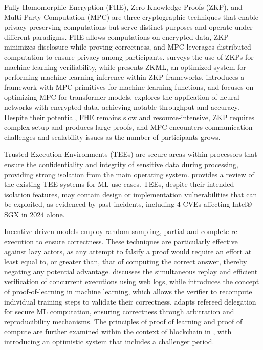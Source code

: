 \documentclass[sigconf, nonacm]{acmart}
\begin{document}
Fully Homomorphic Encryption (FHE), Zero-Knowledge Proofs (ZKP), and Multi-Party Computation (MPC) are three cryptographic techniques that enable privacy-preserving computations but serve distinct purposes and operate under different paradigms. FHE allows computations on encrypted data, ZKP minimizes disclosure while proving correctness, and MPC leverages distributed computation to ensure privacy among participants.
\cite{xing2023zero} surveys the use of ZKPs for machine learning verifiability, while \cite{chen2024zkml} presents ZKML, an optimized system for performing machine learning inference within ZKP frameworks. \cite{knott2021crypten} introduces a framework with MPC primitives for machine learning functions, and \cite{pang2024bolt} focuses on optimizing MPC for transformer models. \cite{gilad2016cryptonets} explores the application of neural networks with encrypted data, achieving notable throughput and accuracy.
Despite their potential, FHE remains slow and resource-intensive, ZKP requires complex setup and produces large proofs, and MPC encounters communication challenges and scalability issues as the number of participants grows.

Trusted Execution Environments (TEEs) are secure areas within processors that ensure the confidentiality and integrity of sensitive data during processing, providing strong isolation from the main operating system. \cite{mo2024machine} provides a review of the existing TEE systems for ML use cases.
TEEs, despite their intended isolation features, may contain design or implementation vulnerabilities that can be exploited, as evidenced by past incidents, including 4 CVEs affecting Intel® SGX in 2024 alone.

Incentive-driven models employ random sampling, partial and complete re-execution to ensure correctness. These techniques are particularly effective against lazy actors, as any attempt to falsify a proof would require an effort at least equal to, or greater than, that of computing the correct answer, thereby negating any potential advantage. \cite{tan2017efficient} discusses the simultaneous replay and efficient verification of concurrent executions using web logs, while \cite{jia2021proof} introduces the concept of proof-of-learning in machine learning, which allows the verifier to recompute individual training steps to validate their correctness. \cite{arun2025verde} adapts refereed delegation for secure ML computation, ensuring correctness through arbitration and reproducibility mechanisms. The principles of proof of learning and proof of compute are further examined within the context of blockchain in \cite{atoma2024, zhang2024proof, zhao2024proof}, with \cite{conway2024opml} introducing an optimistic system that includes a challenger period.
\end{document}

